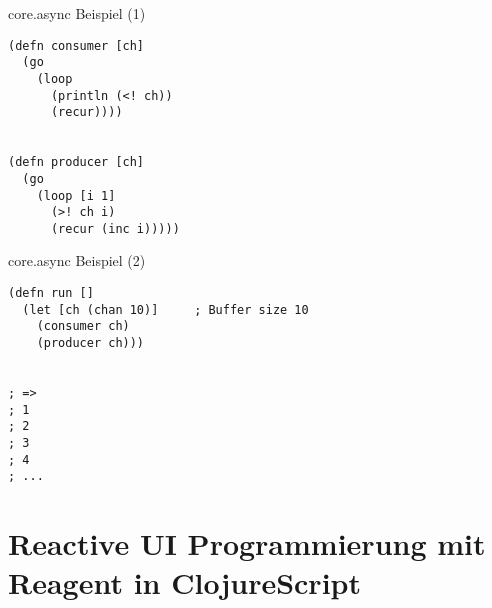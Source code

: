 \documentclass[presentation]{beamer}
\begin{document}
\begin{frame}[fragile]{core.async Beispiel (1)}
  \begin{block}{}
\begin{verbatim}
(defn consumer [ch]
  (go
    (loop
      (println (<! ch))
      (recur))))


(defn producer [ch]
  (go
    (loop [i 1]
      (>! ch i)
      (recur (inc i)))))
\end{verbatim}
  \end{block}
\end{frame}

\begin{frame}[fragile]{core.async Beispiel (2)}
  \begin{block}{}
\begin{verbatim}
(defn run []
  (let [ch (chan 10)]     ; Buffer size 10
    (consumer ch)
    (producer ch)))


; =>
; 1
; 2
; 3
; 4
; ...
\end{verbatim}
  \end{block}
\end{frame}


\section{Reactive UI Programmierung mit Reagent in ClojureScript}
\end{document}
